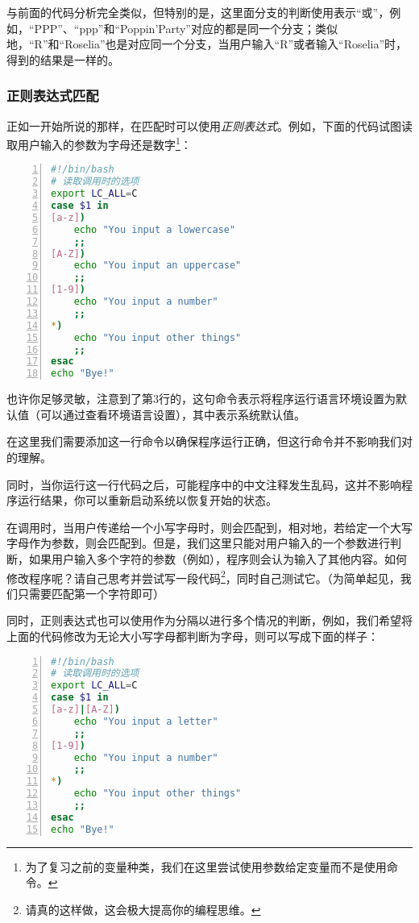 与前面的代码分析完全类似，但特别的是，这里面分支的判断使用\code{|}表示“或”，例如，“PPP”、“ppp”和“Poppin'Party”对应的都是同一个分支；类似地，“R”和“Roselia”也是对应同一个分支，当用户输入“R”或者输入“Roselia”时，得到的结果是一样的。

\subsubsection{正则表达式匹配}

正如一开始所说的那样，在匹配时可以使用\emph{正则表达式}。例如，下面的代码试图读取用户输入的参数为字母还是数字\footnote{为了复习之前的变量种类，我们在这里尝试使用参数给定变量而不是使用命令。}：

\begin{lstlisting}[language=bash,caption=number\_or\_letter,numbers=left]
#!/bin/bash
# 读取调用时的选项
export LC_ALL=C
case $1 in
[a-z])
    echo "You input a lowercase"
    ;;
[A-Z])
    echo "You input an uppercase"
    ;;
[1-9])
    echo "You input a number"
    ;;
*)
    echo "You input other things"
    ;;
esac
echo "Bye!"
\end{lstlisting}

\begin{extend}
    也许你足够灵敏，注意到了第3行的，这句命令表示将程序运行语言环境设置为默认值（可以通过查看环境语言设置），其中表示系统默认值。
    
    在这里我们需要添加这一行命令以确保程序运行正确，但这行命令并不影响我们对的理解。

    同时，当你运行这一行代码之后，可能程序中的中文注释发生乱码，这并不影响程序运行结果，你可以重新启动系统以恢复开始的状态。
\end{extend}

在调用时，当用户传递给一个小写字母时，则会匹配到\code{[a-z]}，相对地，若给定一个大写字母作为参数，则会匹配到\code{[A-Z]}。但是，我们这里只能对用户输入的一个参数进行判断，如果用户输入多个字符的参数（例如），程序则会认为输入了其他内容。如何修改程序呢？请自己思考并尝试写一段代码\footnote{请真的这样做，这会极大提高你的编程思维。}，同时自己测试它。（为简单起见，我们只需要匹配第一个字符即可）

同时，正则表达式也可以使用\code{|}作为分隔以进行多个情况的判断，例如，我们希望将上面的代码修改为无论大小写字母都判断为字母，则可以写成下面的样子：

\begin{lstlisting}[language=bash,caption=number\_or\_letter2,numbers=left]
#!/bin/bash
# 读取调用时的选项
export LC_ALL=C
case $1 in
[a-z]|[A-Z])
    echo "You input a letter"
    ;;
[1-9])
    echo "You input a number"
    ;;
*)
    echo "You input other things"
    ;;
esac
echo "Bye!"
\end{lstlisting}


